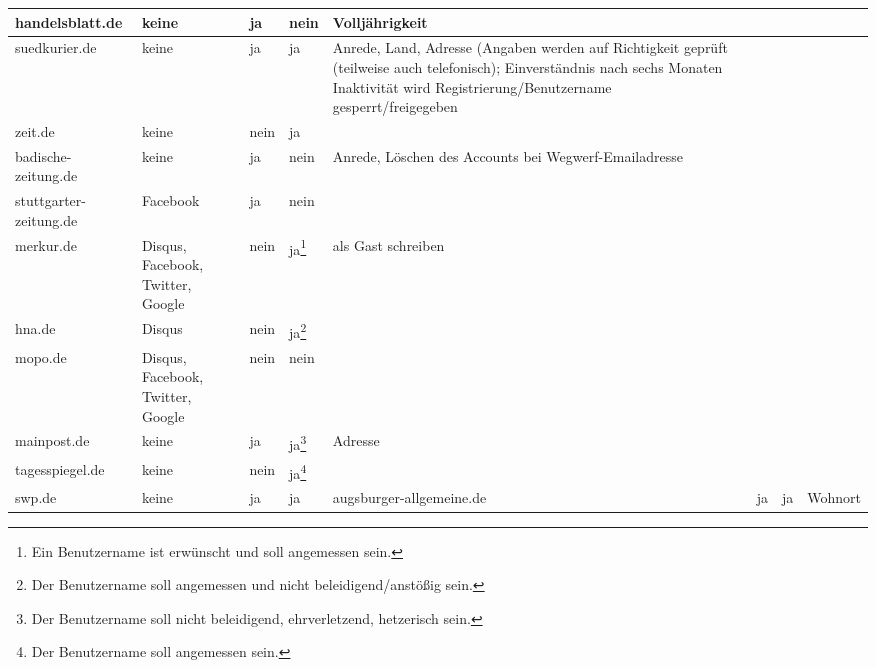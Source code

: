 \begin{landscape}
\begin{longtable}{l|p{28mm}p{20mm}p{20mm}p{90mm}}
  handelsblatt.de & %
    keine & ja & nein &
    Volljährigkeit \\\hline

  suedkurier.de & %
    keine & ja & ja &
    Anrede, Land, Adresse (Angaben werden auf Richtigkeit geprüft (teilweise
    auch telefonisch); Einverständnis nach sechs Monaten Inaktivität wird
    Registrierung/Benutzername gesperrt/freigegeben \\\hline

  zeit.de & %
    keine & nein & ja &
    \\\hline

  badische-zeitung.de & %
    keine & ja & nein &
    Anrede, Löschen des Accounts bei Wegwerf-Emailadresse
    \\\hline

  stuttgarter-zeitung.de & %
    Facebook & ja & nein &
    \\\hline

  merkur.de & %
    Disqus, Facebook, Twitter, Google & nein & ja\footnote{Ein Benutzername ist erwünscht und soll angemessen sein.} &
    als Gast schreiben \\\hline

  hna.de & %
    Disqus & nein & ja\footnote{Der Benutzername soll angemessen und nicht beleidigend/anstößig sein.} &
    \\\hline

  mopo.de & %
    Disqus, Facebook, Twitter, Google & nein & nein &
    \\\hline

  mainpost.de & %
    keine & ja & ja\footnote{Der Benutzername soll nicht beleidigend, ehrverletzend, hetzerisch sein.} &
    Adresse \\\hline

  tagesspiegel.de & %
    keine & nein & ja\footnote{Der Benutzername soll angemessen sein.} &
    \\\hline

  swp.de & %
    keine & ja & ja &
  augsburger-allgemeine.de &%
  & ja &ja & Wohnort 
    \\ \hline

\end{longtable}
\end{landscape}

